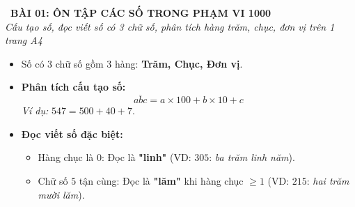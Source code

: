 \documentclass[12pt,a4paper]{article}
\begin{document}
\begin{tcolorbox}[
  enhanced,
  colback=teal!8!white,
  colframe=teal!70!black,
  arc=3mm, boxrule=1.2pt,
  left=3mm, right=3mm, top=2mm, bottom=2mm,
  halign=center
]
  {\LARGE\bfseries\color{teal!90!black}\faBookmark\ BÀI 01: ÔN TẬP CÁC SỐ TRONG PHẠM VI 1000}\\[1mm]
  {\itshape\footnotesize\color{black!75} Cấu tạo số, đọc viết số có 3 chữ số, phân tích hàng trăm, chục, đơn vị trên 1 trang A4}
\end{tcolorbox}

\vspace{-2mm}

\noindent
\begin{minipage}[t]{0.49\textwidth}\vspace{0pt}
\begin{tcolorbox}[
  enhanced,
  colback=blue!4!white,
  colframe=blue!75!black,
  arc=2mm, boxrule=0.8pt,
  left=2mm, right=2mm, top=1.8mm, bottom=1.8mm,
  title={\footnotesize\bfseries\color{white}\faDatabase\ 1. Cấu tạo số \& Phân tích số}
]
{\footnotesize
\begin{itemize}\setlength{\itemsep}{1pt}\setlength{\leftskip}{-2.5mm}
  \item Số có 3 chữ số gồm 3 hàng: \textbf{Trăm, Chục, Đơn vị}.
  \item \textbf{Phân tích cấu tạo số:}
  $$\overline{abc} = a \times 100 + b \times 10 + c$$
  \textit{Ví dụ:} $547 = 500 + 40 + 7$.
  \item \textbf{Đọc viết số đặc biệt:}
  \begin{itemize}\setlength{\itemsep}{0.5pt}\setlength{\leftskip}{-2.5mm}
    \item Hàng chục là $0$: Đọc là \textbf{"linh"} (VD: $305$: \textit{ba trăm linh năm}).
    \item Chữ số $5$ tận cùng: Đọc là \textbf{"lăm"} khi hàng chục $\ge 1$ (VD: $215$: \textit{hai trăm mười lăm}).
  \end{itemize}
\end{itemize}
}
\end{tcolorbox}
\end{minipage}
\hfill
\end{document}
